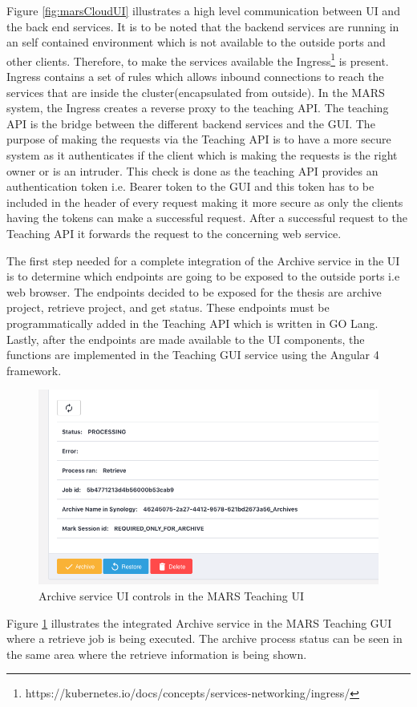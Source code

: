 Figure \ref{fig:marsCloudUI} illustrates a high level communication between UI and the back end services. It is to be noted that the backend services
are running in an self contained environment which is not available to the outside ports and other clients. Therefore, 
to make the services available the Ingress\footnote{https://kubernetes.io/docs/concepts/services-networking/ingress/} is present. Ingress contains
a set of rules which allows inbound connections to reach the services that are inside the cluster(encapsulated from outside). In the MARS system,
the Ingress creates a reverse proxy to the teaching API. The teaching API is the bridge between the different backend services and the GUI. The purpose
of making the requests via the Teaching API is to have a more secure system as it authenticates if the client which is making the requests is the right owner or 
is an intruder. This check is done as the teaching API provides an authentication token i.e. Bearer token to the GUI and this token has to be included in the
header of every request making it more secure as only the clients having the tokens can make a successful request. After a successful request to the Teaching API
it forwards the request to the concerning web service.


The first step needed for a complete integration of the Archive service in the UI is to determine which endpoints are going to be exposed to the outside ports i.e web browser.
The endpoints decided to be exposed for the thesis are archive project, retrieve project, and get status. These endpoints must be programmatically added
in the Teaching API which is written in GO Lang. Lastly, after the endpoints are made available to the UI components, the functions are implemented in the Teaching GUI service
using the Angular 4 framework. 

\begin{figure}[H]
    \centering \includegraphics[scale=0.5]{grafiken/archiveUI.png}
    \caption{Archive service UI controls in the MARS Teaching UI}
    \label{fig:archiveUI}
\end{figure}

Figure \ref{fig:archiveUI} illustrates the integrated Archive service in the MARS Teaching GUI where a retrieve job is being executed. The archive process
status can be seen in the same area where the retrieve information is being shown.
